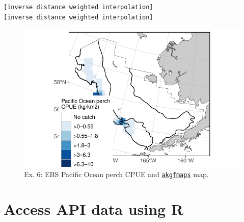 \documentclass[
  letterpaper,
  oneside,
  open=any]{scrbook}
\newenvironment{Shaded}{\begin{snugshade}}{\end{snugshade}}
\newcommand{\AttributeTok}[1]{\textcolor[rgb]{0.40,0.45,0.13}{#1}}
\newcommand{\ConstantTok}[1]{\textcolor[rgb]{0.56,0.35,0.01}{#1}}
\newcommand{\FunctionTok}[1]{\textcolor[rgb]{0.28,0.35,0.67}{#1}}
\newcommand{\NormalTok}[1]{\textcolor[rgb]{0.00,0.23,0.31}{#1}}
\newcommand{\SpecialCharTok}[1]{\textcolor[rgb]{0.37,0.37,0.37}{#1}}
\newcommand{\StringTok}[1]{\textcolor[rgb]{0.13,0.47,0.30}{#1}}
\begin{document}
\begin{verbatim}
[inverse distance weighted interpolation]
[inverse distance weighted interpolation]
\end{verbatim}

\begin{Shaded}
\end{Shaded}

\begin{figure}[H]

{\centering \includegraphics{content/akfin-oracle-sql-r_files/figure-pdf/test-6-fig-1.pdf}

}

\caption{Ex. 6: EBS Pacific Ocean perch CPUE and
\href{https://github.com/afsc-gap-products/akgfmaps}{\texttt{akgfmaps}}
map.}

\end{figure}

\hypertarget{access-api-data-using-r}{%
\chapter{Access API data using R}\label{access-api-data-using-r}}
\end{document}

